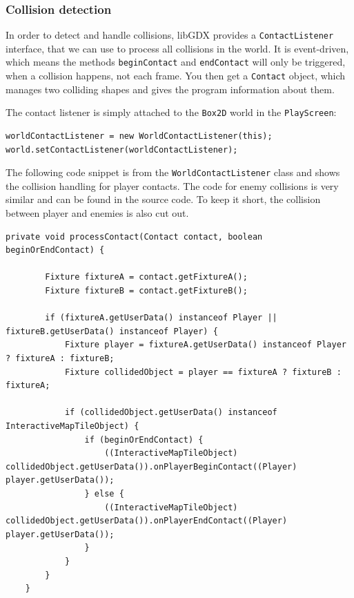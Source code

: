 \documentclass[12p]{article}
\begin{document}
\subsubsection{Collision detection} \label{DocCollisionDetection}

In order to detect and handle collisions, libGDX provides a \texttt{ContactListener} interface, that we can use to process all collisions in the world. It is event-driven, which means the methods \texttt{beginContact} and \texttt{endContact} will only be triggered, when a collision happens, not each frame. You then get a \texttt{Contact} object, which manages two colliding shapes and gives the program information about them.

The contact listener is simply attached to the \texttt{Box2D} world in the \texttt{PlayScreen}:

\begin{verbatim}
worldContactListener = new WorldContactListener(this);
world.setContactListener(worldContactListener);
\end{verbatim}

The following code snippet is from the \texttt{WorldContactListener} class and shows the collision handling for player contacts. The code for enemy collisions is very similar and can be found in the source code. To keep it short, the collision between player and enemies is also cut out.

\begin{verbatim}
private void processContact(Contact contact, boolean beginOrEndContact) {

        Fixture fixtureA = contact.getFixtureA();
        Fixture fixtureB = contact.getFixtureB();

        if (fixtureA.getUserData() instanceof Player || fixtureB.getUserData() instanceof Player) {
            Fixture player = fixtureA.getUserData() instanceof Player ? fixtureA : fixtureB;
            Fixture collidedObject = player == fixtureA ? fixtureB : fixtureA;

            if (collidedObject.getUserData() instanceof InteractiveMapTileObject) {
                if (beginOrEndContact) {
                    ((InteractiveMapTileObject) collidedObject.getUserData()).onPlayerBeginContact((Player) player.getUserData());
                } else {
                    ((InteractiveMapTileObject) collidedObject.getUserData()).onPlayerEndContact((Player) player.getUserData());
                }
            }
        }
    }
\end{verbatim}
\end{document}
